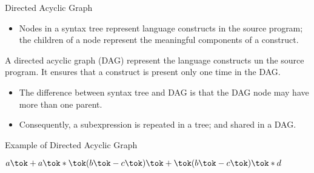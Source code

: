 \begin{bibunit}[apalike]
\begin{frame}{Directed Acyclic Graph}
	\begin{itemize}
	\item Nodes in a syntax tree represent language constructs in the source program; the children of a node represent the meaningful components of a construct.
	\end{itemize}
	\vfill
	\begin{definition}
		A directed acyclic graph (DAG) represent the language constructs un the source program.
		It ensures that a construct is present only one time in the DAG.
	\end{definition}
	\vfill
	\begin{itemize}
	\item The difference between syntax tree and DAG is that the DAG node may have more than one parent.
	\item Consequently, a subexpression is repeated in a tree; and shared in a DAG.
	\end{itemize}
\end{frame}

\begin{frame}{Example of Directed Acyclic Graph}
	\begin{center}
		$a \tok+ a \tok* \tok( b \tok- c \tok) \tok+ \tok( b \tok- c \tok) \tok* d$
	\end{center}
	\vspace{2em}
\end{frame}


\end{bibunit}

